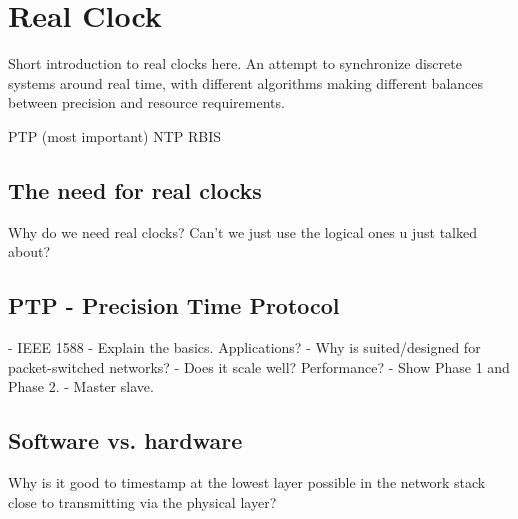 \section{Real Clock}\label{sc:realClock}

Short introduction to real clocks here.
An attempt to synchronize discrete systems around real time, with different algorithms making different balances between precision and resource requirements.

PTP (most important)
NTP
RBIS

\subsection{The need for real clocks}

Why do we need real clocks? Can't we just use the logical ones u just talked about?

\subsection{PTP - Precision Time Protocol}

- IEEE 1588
- Explain the basics. Applications?
- Why is suited/designed for packet-switched networks?
- Does it scale well? Performance?
- Show Phase 1 and Phase 2.
- Master slave.

\subsection{Software vs. hardware}

Why is it good to timestamp at the lowest layer possible in the network stack close to transmitting via the physical layer?